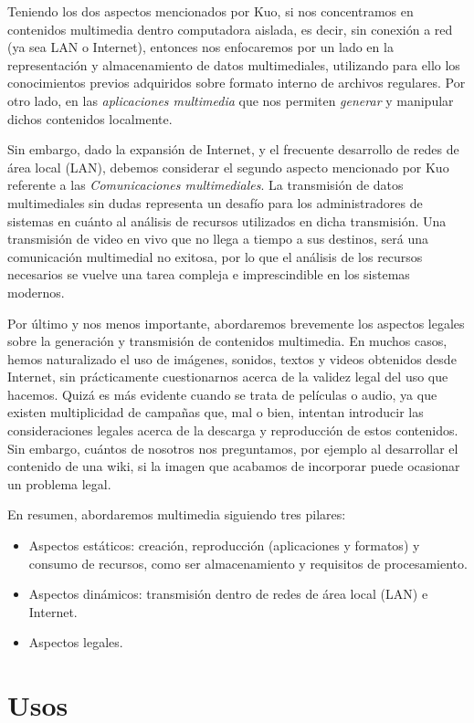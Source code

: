 \documentclass[12pt]{article}
\begin{document}
Teniendo los dos aspectos mencionados por Kuo, si nos concentramos en contenidos 
multimedia dentro computadora aislada, es decir,  sin conexión a red (ya sea LAN o 
Internet), entonces nos enfocaremos por un lado en la representación y almacenamiento 
de datos multimediales, utilizando para ello los conocimientos previos 
adquiridos sobre formato interno de archivos regulares. Por otro lado, en 
las {\it aplicaciones multimedia} que nos permiten {\it generar} y manipular 
dichos contenidos localmente. 

Sin embargo, dado la expansión de Internet, y el frecuente desarrollo 
de redes de área local (LAN), debemos considerar el segundo aspecto mencionado
por Kuo referente a las {\it Comunicaciones multimediales}. La transmisión 
de datos multimediales sin dudas representa un desafío para los administradores
de sistemas en cuánto al análisis de recursos utilizados en dicha transmisión.
Una transmisión de video en vivo que no llega a tiempo a sus destinos, será 
una comunicación multimedial no exitosa, por lo que el análisis de los 
recursos necesarios se vuelve una tarea compleja e imprescindible en los 
sistemas modernos. 

Por último y nos menos importante, abordaremos brevemente los aspectos legales 
sobre la generación y transmisión de contenidos multimedia. En muchos casos,
hemos naturalizado el uso de imágenes, sonidos, textos y videos obtenidos 
desde Internet, sin prácticamente cuestionarnos acerca de la validez 
legal del uso que hacemos. Quizá es más evidente cuando se trata de 
películas o audio, ya que existen multiplicidad de campañas que, mal o 
bien, intentan introducir las consideraciones legales acerca de la descarga y 
reproducción de estos contenidos. Sin embargo, cuántos de nosotros nos 
preguntamos, por ejemplo al desarrollar el contenido de una wiki, si la 
imagen que acabamos de incorporar puede ocasionar un problema legal. 

En resumen, abordaremos multimedia siguiendo tres pilares:
\begin{itemize}
\item Aspectos estáticos: creación, reproducción (aplicaciones y formatos) y 
consumo de recursos, como ser almacenamiento y requisitos de procesamiento. 
\item Aspectos dinámicos: transmisión dentro de redes de área local (LAN) e 
Internet. 
\item Aspectos legales.  
\end{itemize}

\section*{Usos}
\end{document}
